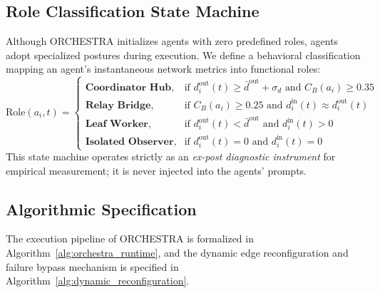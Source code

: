 \documentclass{ieeeaccess}
\begin{document}
\subsection{Role Classification State Machine}
Although ORCHESTRA initializes agents with zero predefined roles, agents adopt specialized postures during execution. We define a behavioral classification mapping an agent's instantaneous network metrics into functional roles:
\begin{equation}
\label{eq:role_classification}
\text{Role}(a_i, t) = \begin{cases}
\textbf{Coordinator Hub}, & \text{if } d_i^{\text{out}}(t) \ge \bar{d}^{\text{out}} + \sigma_d \text{ and } C_B(a_i) \ge 0.35 \\
\textbf{Relay Bridge}, & \text{if } C_B(a_i) \ge 0.25 \text{ and } d_i^{\text{in}}(t) \approx d_i^{\text{out}}(t) \\
\textbf{Leaf Worker}, & \text{if } d_i^{\text{out}}(t) < \bar{d}^{\text{out}} \text{ and } d_i^{\text{in}}(t) > 0 \\
\textbf{Isolated Observer}, & \text{if } d_i^{\text{out}}(t) = 0 \text{ and } d_i^{\text{in}}(t) = 0
\end{cases}
\end{equation}
This state machine operates strictly as an \textit{ex-post diagnostic instrument} for empirical measurement; it is never injected into the agents' prompts.

\subsection{Algorithmic Specification}
The execution pipeline of ORCHESTRA is formalized in Algorithm~\ref{alg:orchestra_runtime}, and the dynamic edge reconfiguration and failure bypass mechanism is specified in Algorithm~\ref{alg:dynamic_reconfiguration}.
\end{document}
